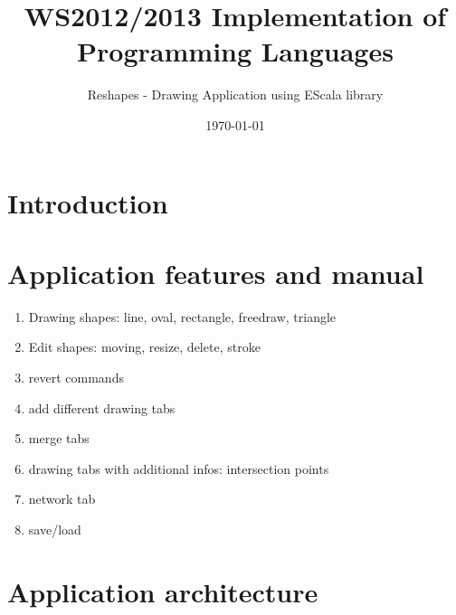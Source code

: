 \documentclass[12pt, accentcolor=tud9c, linedtoc, bigchapter, colorback, noresetcounter, numbersubsubsec]{tudreport}
\date{\today}
\title{WS2012/2013 Implementation of Programming Languages}
\subtitle{Reshapes - Drawing Application using EScala library}
\begin{document}
\maketitle
\tableofcontents

\chapter{Introduction}

\chapter{Application features and manual}

\begin{enumerate}
    \item Drawing shapes: line, oval, rectangle, freedraw, triangle
    \item Edit shapes: moving, resize, delete, stroke
    \item revert commands
    \item add different drawing tabs
    \item merge tabs
    \item drawing tabs with additional infos: intersection points
    \item network tab
    \item save/load
\end{enumerate}

\chapter{Application architecture}
\end{document}
